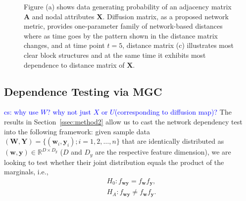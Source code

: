 \documentclass[11pt]{article}
\theoremstyle{definition}
\newcommand{\cs}[1]{\textcolor{blue}{cs: #1}}
\begin{document}
\begin{figure}[ht]
\begin{subfigure}[b]{0.23\textwidth}
		\caption{}
		\label{fig:d}
	\end{subfigure}
	\caption{Figure (a) shows data generating probability of an adjacency matrix $\mathbf{A}$ and nodal attributes $\mathbf{X}$. Diffusion matrix, as a proposed network metric, provides one-parameter family of network-based distances where as time goes by the pattern shown in the distance matrix changes, and at time point $t = 5$, distance matrix (c) illustrates most clear block structures and at the same time it exhibits most dependence to distance matrix of $\mathbf{X}$.}
	\label{fig:diffusions}
\end{figure}

	\vspace*{-0.4cm}
\subsection{Dependence Testing via MGC}
\label{ssec:method1}
\cs{why use $W$? why not just $X$ or $U$(corresponding to diffusion map)?}
The results in Section~\ref{ssec:method2} allow us to cast the network dependency test into the following framework: given sample data $(\mathbf{W}, \mathbf{Y}) = \{  (\mathbf{w}_{i}, \mathbf{y}_{i} ) ; i = 1,2, \ldots, n \}$ that are identically distributed as $(\mathbf{w},\mathbf{y}) \in \mathbb{R}^{D \times D_y}$ ($D$ and $D_y$ are the respective feature dimension), we are looking to test whether their joint distribution equals the product of the marginals, i.e.,
\begin{align*}
& H_{0}: f_{\mathbf{w}\mathbf{y}}=f_{\mathbf{w}}f_{\mathbf{y}},\\
& H_{A}: f_{\mathbf{w}\mathbf{y}}\neq f_{\mathbf{w}}f_{\mathbf{y}}.
\end{align*}
\end{document}

